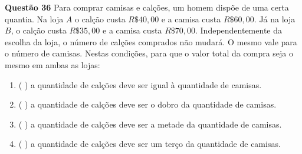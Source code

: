 {\bf Questão 36} 
 Para comprar camisas e calções, um homem dispõe de uma certa quantia. Na loja $A$ o calção custa $R\$ 40,00$ e
a camisa custa $R\$ 60,00$. Já na loja $B$, o calção custa $R\$ 35,00$ e a camisa custa $R\$ 70,00$. Independentemente da
escolha da loja, o número de calções comprados não mudará. O mesmo vale para o número de camisas. Nestas
condições, para que o valor total da compra seja o mesmo em ambas as lojas:

\begin{enumerate}
		\item ( ) a quantidade de calções deve ser igual à quantidade de camisas.
		\item ( ) a quantidade de calções deve ser o dobro da quantidade de camisas.
		\item ( ) a quantidade de calções deve ser a metade da quantidade de camisas.
		\item ( ) a quantidade de calções deve ser um terço da quantidade de camisas.
\end{enumerate}
